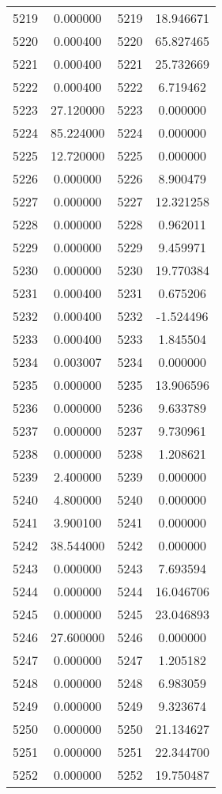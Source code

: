 \documentclass[12pt]{article}
\begin{document}
\begin{longtable}{@{}cccc@{}}
5219 & 0.000000 & 5219 & 18.946671 \\
5220 & 0.000400 & 5220 & 65.827465 \\
5221 & 0.000400 & 5221 & 25.732669 \\
5222 & 0.000400 & 5222 & 6.719462 \\
5223 & 27.120000 & 5223 & 0.000000 \\
5224 & 85.224000 & 5224 & 0.000000 \\
5225 & 12.720000 & 5225 & 0.000000 \\
5226 & 0.000000 & 5226 & 8.900479 \\
5227 & 0.000000 & 5227 & 12.321258 \\
5228 & 0.000000 & 5228 & 0.962011 \\
5229 & 0.000000 & 5229 & 9.459971 \\
5230 & 0.000000 & 5230 & 19.770384 \\
5231 & 0.000400 & 5231 & 0.675206 \\
5232 & 0.000400 & 5232 & -1.524496 \\
5233 & 0.000400 & 5233 & 1.845504 \\
5234 & 0.003007 & 5234 & 0.000000 \\
5235 & 0.000000 & 5235 & 13.906596 \\
5236 & 0.000000 & 5236 & 9.633789 \\
5237 & 0.000000 & 5237 & 9.730961 \\
5238 & 0.000000 & 5238 & 1.208621 \\
5239 & 2.400000 & 5239 & 0.000000 \\
5240 & 4.800000 & 5240 & 0.000000 \\
5241 & 3.900100 & 5241 & 0.000000 \\
5242 & 38.544000 & 5242 & 0.000000 \\
5243 & 0.000000 & 5243 & 7.693594 \\
5244 & 0.000000 & 5244 & 16.046706 \\
5245 & 0.000000 & 5245 & 23.046893 \\
5246 & 27.600000 & 5246 & 0.000000 \\
5247 & 0.000000 & 5247 & 1.205182 \\
5248 & 0.000000 & 5248 & 6.983059 \\
5249 & 0.000000 & 5249 & 9.323674 \\
5250 & 0.000000 & 5250 & 21.134627 \\
5251 & 0.000000 & 5251 & 22.344700 \\
5252 & 0.000000 & 5252 & 19.750487 \\

\end{longtable}
\end{document}
